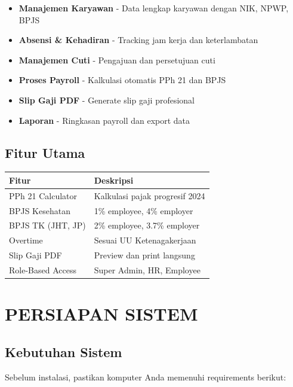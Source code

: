 \documentclass[12pt,a4paper]{article}
\begin{document}
\begin{itemize}
    \item \textbf{Manajemen Karyawan} - Data lengkap karyawan dengan NIK, NPWP, BPJS
    \item \textbf{Absensi \& Kehadiran} - Tracking jam kerja dan keterlambatan
    \item \textbf{Manajemen Cuti} - Pengajuan dan persetujuan cuti
    \item \textbf{Proses Payroll} - Kalkulasi otomatis PPh 21 dan BPJS
    \item \textbf{Slip Gaji PDF} - Generate slip gaji profesional
    \item \textbf{Laporan} - Ringkasan payroll dan export data
\end{itemize}

\subsection{Fitur Utama}
\begin{center}
\begin{tabular}{|l|l|}
    \hline
    \textbf{Fitur} & \textbf{Deskripsi} \\
    \hline
    PPh 21 Calculator & Kalkulasi pajak progresif 2024 \\
    \hline
    BPJS Kesehatan & 1\% employee, 4\% employer \\
    \hline
    BPJS TK (JHT, JP) & 2\% employee, 3.7\% employer \\
    \hline
    Overtime & Sesuai UU Ketenagakerjaan \\
    \hline
    Slip Gaji PDF & Preview dan print langsung \\
    \hline
    Role-Based Access & Super Admin, HR, Employee \\
    \hline
\end{tabular}
\end{center}

\newpage
\section{PERSIAPAN SISTEM}

\subsection{Kebutuhan Sistem}
Sebelum instalasi, pastikan komputer Anda memenuhi requirements berikut:
\end{document}
